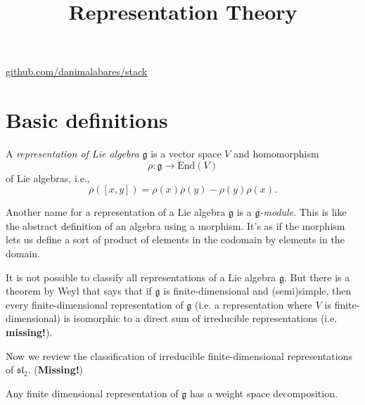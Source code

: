 



\title{Representation Theory}
\maketitle

\label{section-phantom}
\hfill
\href{http://github.com/danimalabares/stack}{github.com/danimalabares/stack}

\tableofcontents

\section{Basic definitions}
\label{section-basic-definitions}

\begin{definition}
\label{definition-representation}
A {\it representation of Lie algebra} $\mathfrak{g}$ is a vector space $V$ 
and homomorphism
$$
\rho:\mathfrak{g} \to \text{End}(V)
$$
of Lie algebras, i.e.,
$$
\rho([x,y])=\rho(x)\rho(y)-\rho(y)\rho(x).
$$
\end{definition}

\begin{remark}
\label{remark-representations-are-modules}
Another name for a representation of a Lie algebra $\mathfrak{g}$ is a 
{\it $\mathfrak{g}$-module}. This is like the abstract definition of an algebra
using a morphism. It's as if the morphism lets us define a sort of product of
elements in the codomain by elements in the domain.
\end{remark}

It is not possible to classify all representations of a Lie algebra
$\mathfrak{g}$. But there is a theorem by Weyl that says that if $\mathfrak{g}$
is finite-dimensional and (semi)simple, then every finite-dimensional
representation of $\mathfrak{g}$ 
(i.e. a representation where $V$ is finite-dimensional) 
is isomorphic to a direct sum of irreducible representations 
(i.e. {\bf missing!}).

\medskip\noindent
Now we review the classification of irreducible finite-dimensional
representations of $\mathfrak{sl}_2$. ({\bf Missing!})

\begin{definition}
\label{definition-weight-space-decomposition}

\end{definition}

\begin{exercise}
\label{exercise-any-finite-dimensional-representation-of-g-has-weight-space-
decomposition}
Any finite dimensional representation of $\mathfrak{g}$ has a weight space
decomposition.
\end{exercise}

